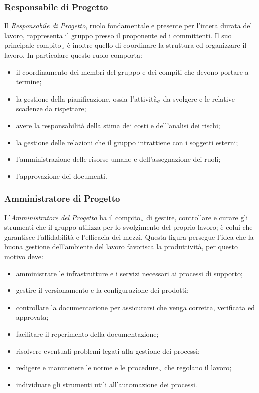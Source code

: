 \subsubsection{Responsabile di Progetto}\label{ProcessiOrganizzativiProcessoDiPianificazioneRuoliDiProgettoResponsabileDiProgetto}

Il \textit{Responsabile di Progetto}, ruolo fondamentale e presente per l'intera durata del lavoro, rappresenta il gruppo presso il proponente ed i committenti. Il suo principale compito$_{\scaleto{G}{3pt}}$ è inoltre quello di coordinare la struttura ed organizzare il lavoro. In particolare questo ruolo comporta:
\begin{itemize}
	\item il coordinamento dei membri del gruppo e dei compiti che devono portare a termine;
	\item la gestione della pianificazione, ossia l'attività$_{\scaleto{G}{3pt}}$ da svolgere e le relative scadenze da rispettare;
	\item avere la responsabilità della stima dei costi e dell'analisi dei rischi;
	\item la gestione delle relazioni che il gruppo intrattiene con i soggetti esterni;
	\item l'amministrazione delle risorse umane e dell'assegnazione dei ruoli;
	\item l'approvazione dei documenti.
\end{itemize}

\subsubsection{Amministratore di Progetto}\label{ProcessiOrganizzativiProcessoDiPianificazioneRuoliDiProgettoAmministratoreDiProgetto}

L'\textit{Amministratore del Progetto} ha il compito$_{\scaleto{G}{3pt}}$ di gestire, controllare e curare gli strumenti che il gruppo utilizza per lo svolgimento del proprio lavoro; è colui che garantisce l'affidabilità e l'efficacia dei mezzi. Questa figura persegue l'idea che la buona gestione dell'ambiente del lavoro favorisca la produttività, per questo motivo deve:
\begin{itemize}
	\item amministrare le infrastrutture e i servizi necessari ai processi di supporto;
	\item gestire il versionamento e la configurazione dei prodotti;
	\item controllare la documentazione per assicurarsi che venga corretta, verificata ed approvata;
	\item facilitare il reperimento della documentazione;
	\item risolvere eventuali problemi legati alla gestione dei processi;
	\item redigere e manutenere le norme e le procedure$_{\scaleto{G}{3pt}}$ che regolano il lavoro;
	\item individuare gli strumenti utili all'automazione dei processi.
\end{itemize}

